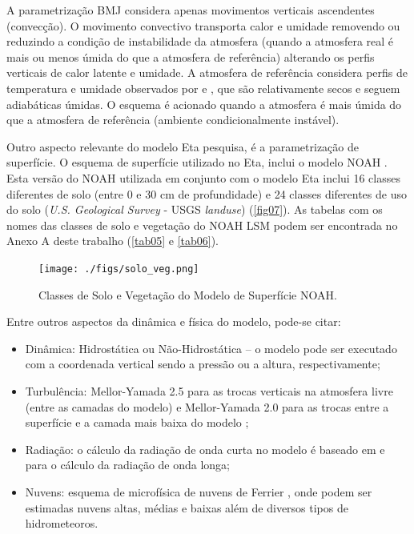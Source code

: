 A parametrização BMJ considera apenas movimentos verticais ascendentes (convecção). O movimento convectivo transporta calor e umidade removendo ou reduzindo a condição de instabilidade da atmosfera (quando a atmosfera real é mais ou menos úmida do que a atmosfera de referência) alterando os perfis verticais de calor latente e umidade. A atmosfera de referência considera perfis de temperatura e umidade observados por  e , que são relativamente secos e seguem adiabáticas úmidas. O esquema é acionado quando a atmosfera é mais úmida do que a atmosfera de referência (ambiente condicionalmente instável).

Outro aspecto relevante do modelo Eta pesquisa, é a parametrização de superfície. O esquema de superfície utilizado no Eta, inclui o modelo NOAH \cite{mitchelletal01}. Esta versão do NOAH utilizada em conjunto com o modelo Eta  inclui 16 classes diferentes de solo (entre 0 e 30 cm de profundidade) e 24 classes diferentes de uso do solo (\textit{U.S. Geological Survey} - USGS \textit{landuse}) (\autoref{fig07}). As tabelas com os nomes das classes de solo e vegetação do NOAH LSM podem ser encontrada no Anexo A deste trabalho (\autoref{tab05} e \autoref{tab06}).

\begin{figure}[!hpb]
\centering
\texttt{[image: ./figs/solo\_veg.png]}
\caption{Classes de Solo e Vegetação do Modelo de Superfície NOAH.}
\label{fig07}
\end{figure}

Entre outros aspectos da dinâmica e física do modelo, pode-se citar:
 
\begin{itemize}
\item Dinâmica: Hidrostática ou Não-Hidrostática – o modelo pode ser executado com a coordenada vertical sendo a pressão ou a altura, respectivamente;
\item Turbulência: Mellor-Yamada 2.5 para as trocas verticais na atmosfera livre (entre as camadas do modelo) e Mellor-Yamada 2.0 para as trocas entre a superfície e a camada mais baixa do modelo \cite{melloryamada74};
\item Radiação: o cálculo da radiação de onda curta no modelo é baseado em  e  para o cálculo da radiação de onda longa;
\item Nuvens: esquema de microfísica de nuvens de Ferrier \cite{ferrieretal02}, onde podem ser estimadas nuvens altas, médias e baixas além de diversos tipos de hidrometeoros.
\end{itemize}

